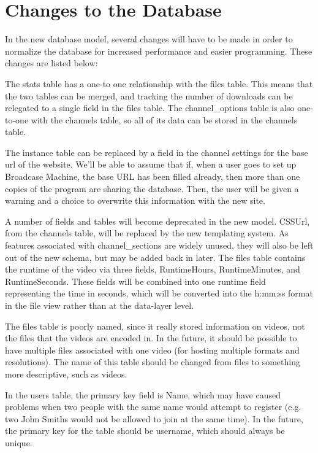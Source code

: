 \documentclass[a4paper,12pt]{report}
\begin{document}
\section{Changes to the Database}
	In the new database model, several changes will have to be made in order to normalize the database for increased performance and easier programming. These changes are listed below:

	The stats table has a one-to one relationship with the files table. This means that the two tables can be merged, and tracking the number of downloads can be relegated to a single field in the files table. The channel_options table is also one-to-one with the channels table, so all of its data can be stored in the channels table.

	The instance table can be replaced by a field in the channel settings for the base url of the website. We'll be able to assume that if, when a user goes to set up Broadcase Machine, the base URL has been filled already, then more than one copies of the program are sharing the database. Then, the user will be given a warning and a choice to overwrite this information with the new site.

	A number of fields and tables will become deprecated in the new model. CSSUrl, from the channels table, will be replaced by the new templating system. As features associated with channel_sections are widely unused, they will also be left out of the new schema, but may be added back in later. The files table contains the runtime of the video via three fields, RuntimeHours, RuntimeMinutes, and RuntimeSeconds. These fields will be combined into one runtime field representing the time in seconds, which will be converted into the h:mm:ss format in the file view rather than at the data-layer level.

	The files table is poorly named, since it really stored information on videos, not the files that the videos are encoded in. In the future, it should be possible to have multiple files associated with one video (for hosting multiple formats and resolutions). The name of this table should be changed from files to something more descriptive, such as videos.

	In the users table, the primary key field is Name, which may have caused problems when two people with the same name would attempt to register (e.g. two John Smiths would not be allowed to join at the same time). In the future, the primary key for the table should be username, which should always be unique.
\end{document}
